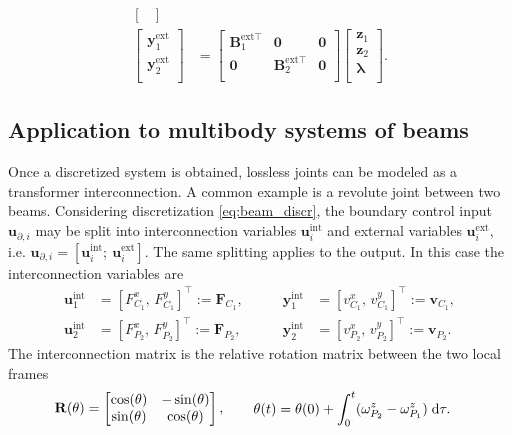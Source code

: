 \begin{align*}
\begin{bmatrix}
\end{bmatrix} \\
\begin{bmatrix}
\mathbf{y}_1^{\text{ext}} \\ \mathbf{y}_2^{\text{ext}} \\
\end{bmatrix}  &= \begin{bmatrix}
\mathbf{B}_1^{\text{ext} \top} & \mathbf{0} & \mathbf{0} \\
\mathbf{0} & \mathbf{B}_2^{\text{ext} \top} & \mathbf{0} \\
\end{bmatrix} \begin{bmatrix}
\mathbf{z}_1 \\ 
\mathbf{z}_2 \\
\bm{\lambda} \\
\end{bmatrix}.
\end{align*}



\subsection{Application to multibody systems of beams}
\label{sec:int_beams}
Once a discretized system is obtained, lossless joints can be modeled as a transformer interconnection. A common example is a revolute joint between two beams. Considering discretization \eqref{eq:beam_discr}, the boundary control input $\mathbf{u}_{\partial, i}$ may be split into interconnection variables $\mathbf{u}_i^{\text{int}}$ and external variables  $\mathbf{u}_i^{\text{ext}}$, i.e. $\mathbf{u}_{\partial, i} = [\mathbf{u}_i^{\text{int}}; \ \mathbf{u}_i^{\text{ext}}]$. The same splitting applies to the output. In this case the interconnection variables are
\begin{equation*}
\begin{aligned}
\mathbf{u}_1^{\text{int}} &= [F^x_{C_1}, \, F^y_{C_1}]^\top := \mathbf{F}_{C_1}, \\
\mathbf{u}_2^{\text{int}} &= [F^x_{P_2}, \, F^y_{P_2}]^\top := \mathbf{F}_{P_2},
\end{aligned} \qquad
\begin{aligned}
\mathbf{y}_1^{\text{int}} &= [v^x_{C_1}, \, v^y_{C_1}]^\top := \mathbf{v}_{C_1}, \\
\mathbf{y}_2^{\text{int}} &= [v^x_{P_2}, \, v^y_{P_2}]^\top := \mathbf{v}_{P_2}.
\end{aligned}
\end{equation*}
The interconnection matrix is the relative rotation matrix between the two local frames
\begin{equation}
\mathbf{R}(\theta) = \begin{bmatrix}
\cos(\theta) & - \sin(\theta) \\
\sin(\theta) & \cos(\theta) \\
\end{bmatrix}, \qquad 
\begin{aligned}
\theta(t) &= \theta(0) + \int_{0}^t (\omega^z_{P_2} - \omega^z_{P_1}) \d{\tau}.
\end{aligned}
\end{equation}

